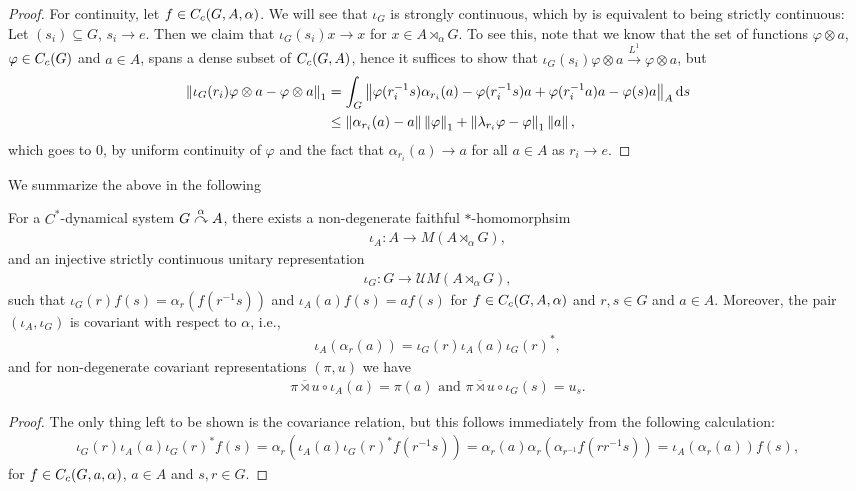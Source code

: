 \begin{proof}
For continuity, let $f \in C_c(G,A,\alpha)$. We will see that $\iota_G$ is strongly continuous, which by  is equivalent to being strictly continuous: Let $(s_i)\subseteq G$, $s_i \to e$. Then we claim that $\iota_G(s_i) x \to x$ for $x \in A \rtimes_\alpha G$. To see this, note that we know that the set of functions $\varphi \otimes a$, $\varphi \in C_c(G)$ and $a \in A$, spans a dense subset of $C_c(G,A)$, hence it suffices to show that $\iota_G(s_i) \varphi \otimes a \stackrel{L^1}{\to} \varphi \otimes a$, but
\begin{align*}
	\left\lVert \iota_G(r_{i}) \varphi \otimes a - \varphi \otimes a \right\rVert_1 &= \int_G \left\lVert \varphi(r_{i}^{-1}s) \alpha_{r_i}(a) - \varphi(r_i^{-1}s) a + \varphi(r_{i}^{-1}a) a - \varphi(s) a \right\rVert_A \mathrm{d} s\\ 
	& \leq \left\lVert \alpha_{r_i}(a) - a \right\rVert \left\lVert \varphi \right\rVert_1 + \left\lVert \lambda_{r_i} \varphi - \varphi \right\rVert_1 \left\lVert a \right\rVert,
\end{align*}
which goes to $0$, by uniform continuity of $\varphi$ and the fact that $\alpha_{r_i}(a) \to a$ for all $ a\in A$ as $r_i \to e$.
\end{proof}
We summarize the above in the following
\begin{proposition}
For a $C^*$-dynamical system $G \stackrel{\alpha}{\curvearrowright} A$, there exists a non-degenerate faithful $*$-homomorphsim 
\begin{align*}
\iota_A \colon A \to M(A \rtimes_\alpha G),	
\end{align*}
and an injective strictly continuous unitary representation 
\begin{align*}
	\iota_G \colon G \to \mathcal{U}M(A \rtimes_\alpha G),
\end{align*}
such that $\iota_G(r) f(s) = \alpha_r(f(r^{-1}s))$  and $\iota_A(a) f(s) = af(s)$ for $f \in C_c(G,A,\alpha)$ and $r,s \in G$ and $a \in A$. Moreover, the pair $(\iota_A,\iota_G)$ is covariant with respect to $\alpha$, i.e., 
\begin{align*}
	\iota_A(\alpha_r (a) ) = \iota_G(r)  \iota_A(a) \iota_G(r)^*,
\end{align*}
and for non-degenerate covariant representations $(\pi,u)$ we have
\begin{align*}
	\overline{\pi \rtimes u} \circ \iota_A(a) = \pi(a) \text{ and } \overline{\pi \rtimes u } \circ \iota_G (s) = u_s.
\end{align*}
\label{cross:iotaprop}
\end{proposition}
\begin{proof}
The only thing left to be shown is the covariance relation, but this follows immediately from the following calculation:
\begin{align*}
	\iota_G(r) \iota_A(a) \iota_G(r)^* f(s) = \alpha_r(\iota_A(a) \iota_G(r)^{*}f(r^{-1}s)) = \alpha_r(a) \alpha_r ( \alpha_{r^{-1}}f(r r^{-1}s))= \iota_A(\alpha_r(a)) f(s),
\end{align*}
for $f \in C_c(G,a,\alpha)$, $a \in A$ and $s,r \in G$.
\end{proof}
